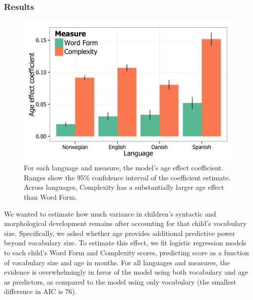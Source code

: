 \documentclass[10pt,letterpaper]{article}
\begin{document}
\subsubsection{Results}

\begin{figure}
\begin{center}
\includegraphics[width=\linewidth]{plots/coefs_wordform_complexity.png}
\end{center}
\caption{\label{fig:coefs_grammar} For each language and measure, the model's age effect coefficient. Ranges show the 95\% confidence interval of the coefficient estimate. Across languages, Complexity has a substantially larger age effect than Word Form.}
\end{figure}

\begin{figure}
\centering
{}
\end{figure}

We wanted to estimate how much variance in children's syntactic and morphological development remains after accounting for that child's vocabulary size. Specifically, we asked whether age provides additional predictive power beyond vocabulary size. To estimate this effect, we fit logistic regression models to each child's Word Form and Complexity scores, predicting score as a function of vocabulary size and age in months. For all languages and measures, the evidence is overwhelmingly in favor of the model using both vocabulary and age as predictors, as compared to the model using only vocabulary (the smallest difference in AIC is 76). %
\end{document}
